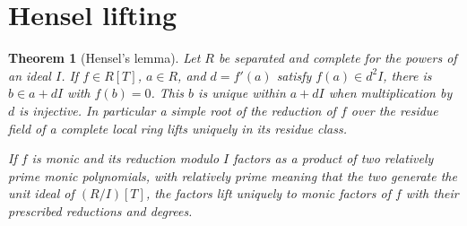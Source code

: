 \documentclass[11pt,oneside,openany]{book}
\newtheorem{theorem}{Theorem}[chapter]
\theoremstyle{definition}
\theoremstyle{remark}
\begin{document}
\section{Hensel lifting}

\begin{theorem}[Hensel's lemma]\label{p103:ALG-05-C04-S02}
Let \(R\) be separated and complete for the powers of an ideal \(I\). If \(f\in R[T]\), \(a\in R\), and \(d=f'(a)\) satisfy \(f(a)\in d^2I\), there is \(b\in a+dI\) with \(f(b)=0\). This \(b\) is unique within \(a+dI\) when multiplication by \(d\) is injective. In particular a simple root of the reduction of \(f\) over the residue field of a complete local ring lifts uniquely in its residue class.

If \(f\) is monic and its reduction modulo \(I\) factors as a product of two relatively prime monic polynomials, with relatively prime meaning that the two generate the unit ideal of \((R/I)[T]\), the factors lift uniquely to monic factors of \(f\) with their prescribed reductions and degrees.
\end{theorem}
\end{document}
